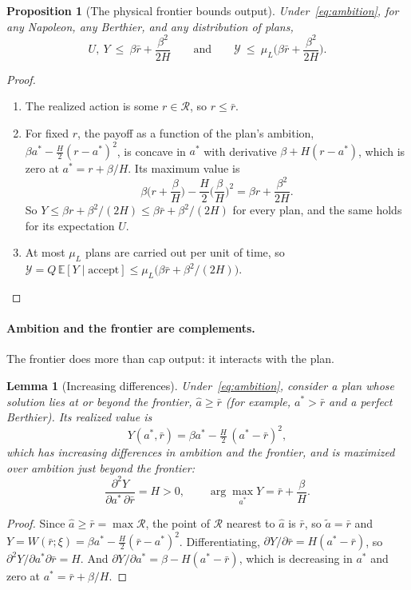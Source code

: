 \documentclass[11pt]{article}
\newcommand{\Nap}{\textcolor{nap}{Napoleon}}
\newcommand{\Ber}{\textcolor{ber}{Berthier}}
\newtheorem{lemma}{Lemma}
\newtheorem{proposition}{Proposition}
\theoremstyle{remark}
\newcommand{\E}{\mathbb{E}}
\newcommand{\Ycal}{\mathcal{Y}}
\newcommand{\Rcal}{\mathcal{R}}
\newcommand{\accept}{\text{accept}}
\begin{document}
\begin{proposition}[The physical frontier bounds output]\label{prop:frontier}
Under~\eqref{eq:ambition}, for any \Nap, any \Ber, and any distribution of plans,
\[
U,\ Y\ \le\ \beta\bar r+\frac{\beta^2}{2H}\qquad\text{and}\qquad\Ycal\ \le\ \mu_L\Big(\beta\bar r+\frac{\beta^2}{2H}\Big).
\]
\end{proposition}

\begin{proof}
\begin{enumerate}
  \item The realized action is some $r\in\Rcal$, so $r\le\bar r$.
  \item For fixed $r$, the payoff as a function of the plan's ambition, $\beta a^*-\frac H2(r-a^*)^2$, is concave in $a^*$ with derivative $\beta+H(r-a^*)$, which is zero at $a^*=r+\beta/H$. Its maximum value is
  \[
  \beta\Big(r+\frac\beta H\Big)-\frac H2\Big(\frac\beta H\Big)^2=\beta r+\frac{\beta^2}{2H}.
  \]
  So $Y\le\beta r+\beta^2/(2H)\le\beta\bar r+\beta^2/(2H)$ for every plan, and the same holds for its expectation $U$.
  \item At most $\mu_L$ plans are carried out per unit of time, so $\Ycal=Q\,\E[Y\mid\accept]\le\mu_L\big(\beta\bar r+\beta^2/(2H)\big)$. \qedhere
\end{enumerate}
\end{proof}

\paragraph{Ambition and the frontier are complements.} The frontier does more than cap output: it interacts with the plan.

\begin{lemma}[Increasing differences]\label{lem:complements}
Under~\eqref{eq:ambition}, consider a plan whose solution lies at or beyond the frontier, $\hat a\ge\bar r$ (for example, $a^*>\bar r$ and a perfect \Ber). Its realized value is
\[
Y(a^*,\bar r)=\beta a^*-\tfrac H2\,(a^*-\bar r)^2,
\]
which has increasing differences in ambition and the frontier, and is maximized over ambition just beyond the frontier:
\[
\frac{\partial^2Y}{\partial a^*\,\partial\bar r}=H>0,\qquad\arg\max_{a^*}Y=\bar r+\frac{\beta}{H}.
\]
\end{lemma}

\begin{proof}
Since $\hat a\ge\bar r=\max\Rcal$, the point of $\Rcal$ nearest to $\hat a$ is $\bar r$, so $\tilde a=\bar r$ and $Y=W(\bar r;\xi)=\beta a^*-\frac H2(\bar r-a^*)^2$. Differentiating, $\partial Y/\partial\bar r=H(a^*-\bar r)$, so $\partial^2Y/\partial a^*\partial\bar r=H$. And $\partial Y/\partial a^*=\beta-H(a^*-\bar r)$, which is decreasing in $a^*$ and zero at $a^*=\bar r+\beta/H$.
\end{proof}
\end{document}
